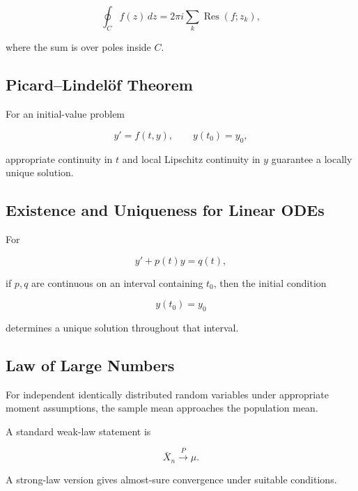 \[
\boxed{
\oint_C
f(z)\,dz
=
2\pi i
\sum_k
\operatorname{Res}(f;z_k),
}
\]

where the sum is over poles inside \(C\).

\subsection{Picard--Lindelöf Theorem}
\label{subsec:picard-lindelof-summary}

For an initial-value problem

\[
y'=f(t,y),
\qquad
y(t_0)=y_0,
\]

appropriate continuity in \(t\) and local Lipschitz continuity in \(y\)
guarantee a locally unique solution.

\subsection{Existence and Uniqueness for Linear ODEs}
\label{subsec:linear-ode-existence-summary}

For

\[
y'+p(t)y=q(t),
\]

if \(p,q\) are continuous on an interval containing \(t_0\), then the initial
condition

\[
y(t_0)=y_0
\]

determines a unique solution throughout that interval.

\subsection{Law of Large Numbers}
\label{subsec:law-large-numbers-summary}

For independent identically distributed random variables under appropriate
moment assumptions, the sample mean approaches the population mean.

A standard weak-law statement is

\[
\boxed{
\bar X_n
\xrightarrow{P}
\mu.
}
\]

A strong-law version gives almost-sure convergence under suitable conditions.

